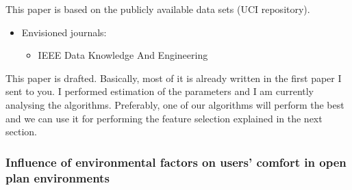 \documentclass[a4paper]{article}
\begin{document}
This paper is based on the publicly available data sets (UCI repository).
	\begin{itemize}
		\item Envisioned journals:
			\begin{itemize}
				\color{blue}
				\item IEEE Data Knowledge And  Engineering
			\end{itemize}
	\end{itemize}

 \color{red}This paper is drafted. Basically, most of it is already written in the first paper I sent to you. I performed estimation of the parameters and I am currently analysing the algorithms. Preferably, one of our algorithms will perform the best and we can use it for performing the feature selection explained in the next section.

\color{black}
\subsubsection{Influence of environmental factors on users' comfort in open plan environments}\label{sec:FeaturesComfort}
\end{document}
